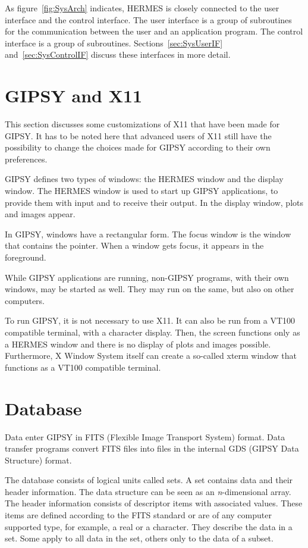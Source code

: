 As figure~\ref{fig:SysArch} indicates, HERMES is closely connected to
the user interface and the control interface.  The user interface is a
group of subroutines for the communication between the user and an
application program.  The control interface is a group of subroutines.
Sections~\ref{sec:SysUserIF}
and~\ref{sec:SysControlIF} discuss these interfaces in more detail. 

\section{GIPSY and X11}
\label{sec:SysGipX11}

This section discusses some customizations of X11 that have been made
for GIPSY.  It has to be noted here that advanced users of X11 still
have the possibility to change the choices made for GIPSY according to
their own preferences. 

GIPSY defines two types of windows: the HERMES window and the display
window.  The HERMES window is used to start up GIPSY applications, to
provide them with input and to receive their output.  In the display
window, plots and images appear. 

In GIPSY, windows have a rectangular form.  The focus window is the
window that contains the pointer.  When a window gets focus, it appears
in the foreground. 

While GIPSY applications are running, non-GIPSY programs, with their own
windows, may be started as well.  They may run on the same, but also on
other computers. 

To run GIPSY, it is not necessary to use X11.  It can also be run from a
VT100 compatible terminal, with a character display.  Then, the screen
functions only as a HERMES window and there is no display of plots and
images possible.  Furthermore, X Window System itself can create a
so-called xterm window that functions as a VT100 compatible terminal. 

\section{Database}
\label{sec:SysDatabase}

Data enter GIPSY in FITS (Flexible Image Transport System) format.  Data
transfer programs convert FITS files into files in the internal GDS
(GIPSY Data Structure) format. 

The database consists of logical units called sets.  A set contains data
and their header information.  The data structure can be seen as an {\em
n}-dimensional array.  The header information consists of descriptor
items with associated values.  These items are defined according to the
FITS standard or are of any computer supported type, for example, a real
or a character.  They describe the data in a set.  Some apply to all
data in the set, others only to the data of a subset. 

